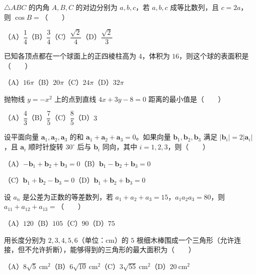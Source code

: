 \begin{question}
$\triangle ABC$ 的内角 $A,B,C$ 的对边分别为 $a,b,c$，若 $a,b,c$ 成等比数列，且 $c=2a$，则 $\cos B=$\mbox{（　　）}

（A）$\dfrac14$\quad（B）$\dfrac34$\quad（C）$\dfrac{\sqrt2}4$\quad（D）$\dfrac{\sqrt2}3$

\end{question}
\begin{question}
已知各顶点都在一个球面上的正四棱柱高为 $4$，体积为 $16$，则这个球的表面积是\mbox{（　　）}

（A）$16\pi$\quad（B）$20\pi$\quad（C）$24\pi$\quad（D）$32\pi$

\end{question}
\begin{question}
抛物线 $y=-x^2$ 上的点到直线 $4x+3y-8=0$ 距离的最小值是\mbox{（　　）}

（A）$\dfrac43$\quad（B）$\dfrac75$\quad（C）$\dfrac85$\quad（D）$3$

\end{question}
\begin{question}
设平面向量 $\boldsymbol a_1,\boldsymbol a_2,\boldsymbol a_3$ 的和 $\boldsymbol a_1+\boldsymbol a_2+\boldsymbol a_3=0$。如果向量 $\boldsymbol b_1,\boldsymbol b_2,\boldsymbol b_3$ 满足 $|\boldsymbol b_i|=2|\boldsymbol a_i|$，且 $\boldsymbol a_i$ 顺时针旋转 $30^\circ$ 后与 $\boldsymbol b_i$ 同向，其中 $i=1,2,3$，则\mbox{（　　）}

（A）$-\boldsymbol b_1+\boldsymbol b_2+\boldsymbol b_3=0$\quad（B）$\boldsymbol b_1-\boldsymbol b_2+\boldsymbol b_3=0$

（C）$\boldsymbol b_1+\boldsymbol b_2-\boldsymbol b_3=0$\quad（D）$\boldsymbol b_1+\boldsymbol b_2+\boldsymbol b_3=0$

\end{question}
\begin{question}
设 $a_n$ 是公差为正数的等差数列，若 $a_1+a_2+a_3=15$，$a_1a_2a_3=80$，则 $a_{11}+a_{12}+a_{13}=$\mbox{（　　）}

（A）$120$\quad（B）$105$\quad（C）$90$\quad（D）$75$

\end{question}
\begin{question}
用长度分别为 $2,3,4,5,6$（单位：cm）的 $5$ 根细木棒围成一个三角形（允许连接，但不允许折断），能够得到的三角形的最大面积为\mbox{（　　）}

（A）$8\sqrt5\ \mathrm{cm}^2$\quad（B）$6\sqrt{10}\ \mathrm{cm}^2$\quad（C）$3\sqrt{55}\ \mathrm{cm}^2$\quad（D）$20\ \mathrm{cm}^2$

\end{question}

